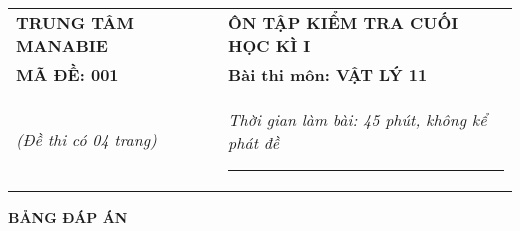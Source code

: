\begin{center}
	\begin{tabular}{M{9.25cm}M{8.75cm}}
		\textbf{TRUNG TÂM MANABIE}& \textbf{ÔN TẬP KIỂM TRA CUỐI HỌC KÌ I}\\
		\textbf{MÃ ĐỀ: 001}& \textbf{Bài thi môn: VẬT LÝ 11}\\
		\textit{(Đề thi có 04 trang)}& \textit{Thời gian làm bài: 45 phút, không kể phát đề}
		
		\noindent\rule{4cm}{0.8pt} \\
	\end{tabular}
\end{center}
\setcounter{section}{0}
\begin{center}
	\textbf{\large BẢNG ĐÁP ÁN}
\end{center}
\section{}
\section{}
\section{}
